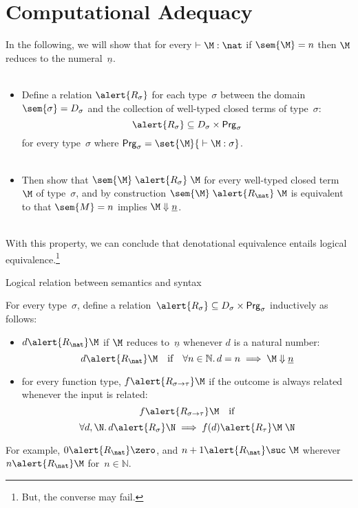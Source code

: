 \section{Computational Adequacy}
\begin{frame}
  In the following, we will show that for every $\vdash \M : \nat$ if
  $\sem{\M} = n$ then $\M$ reduces to the numeral~$\underline{n}$.
  \\~\\
  \begin{itemize}
    \item Define a relation $\alert{R_\sigma}$ for each type~$\sigma$ between
      the domain~$\sem{\sigma} = D_\sigma$ and the collection of
      well-typed closed terms of type~$\sigma$:
      \[
        \alert{R_{\sigma}} \subseteq D_\sigma \times \mathsf{Prg}_\sigma
      \]
      for every type~$\sigma$ where $\mathsf{Prg}_\sigma = \set{ \M }{{}\vdash
        \M : \sigma}$.
      \\~\\
    \item Then show that $\sem{\M}\mathrel{\alert{R_\sigma}} \M$ for every
      well-typed closed term~$\M$ of type~$\sigma$, and by construction
      $\sem{\M} \mathrel{\alert{R_\nat}} \M$ is equivalent to that
      $\sem{M} = n$ implies $\M \Downarrow \underline{n}$. 
  \end{itemize}
  ~\\

  With this property, we can conclude that denotational equivalence entails
  logical equivalence.\footnote{
    But, the converse may fail. 
  }
\end{frame}
\begin{frame}{Logical relation between semantics and syntax}
\begin{definition}
  For every type~$\sigma$, define a relation~$\alert{R_\sigma} \subseteq
  D_\sigma \times \mathsf{Prg}_\sigma$ inductively as follows:
  \begin{itemize}
    \item $d \alert{\mathrel{R_\nat}}\M$
      if $\M$ reduces to~$\underline{n}$
      whenever $d$ is a natural number:
      \[
        d \alert{\mathrel{R_\nat}} \M
        \quad\text{if}\quad \forall n \in \mathbb{N}.\,
        d = n \implies \M \Downarrow \underline{n}
      \]
    \item for every function type, $f \alert{\mathrel{R_{\sigma\to\tau}}} \M$
      if the outcome is always related whenever the input is related:
      \[
        f \alert{\mathrel{R_{\sigma\to\tau}}} \M
        \quad\text{if}
      \]
      \[
        \forall d, 
        \N.\, 
        d \alert{\mathrel{R}_\sigma} \N \implies f(d) \alert{\mathrel{R_\tau}} \M\;\N
      \]
  \end{itemize}
\end{definition}
For example, $0 \alert{\mathrel{R_\nat}} \zero$, and
$n + 1 \alert{\mathrel{R_\nat}}
\suc\;\M$ wherever $n \alert{\mathrel{R_\nat}} \M$ for~$n \in \mathbb{N}$. 

\end{frame}
